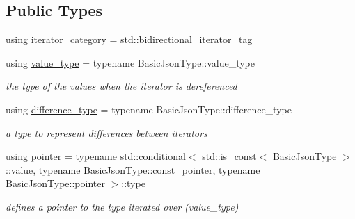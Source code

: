 \subsection*{Public Types}
\begin{DoxyCompactItemize}
\item 
using \mbox{\hyperlink{classnlohmann_1_1detail_1_1iter__impl_ad9e091f5c70b34b5b1abc1ab15fd9106}{iterator\+\_\+category}} = std\+::bidirectional\+\_\+iterator\+\_\+tag
\item 
\mbox{\label{classnlohmann_1_1detail_1_1iter__impl_ab35586a44f2222272c5346baa3013f67}} 
using \mbox{\hyperlink{classnlohmann_1_1detail_1_1iter__impl_ab35586a44f2222272c5346baa3013f67}{value\+\_\+type}} = typename Basic\+Json\+Type\+::value\+\_\+type
\begin{DoxyCompactList}\small\item\em the type of the values when the iterator is dereferenced \end{DoxyCompactList}\item 
\mbox{\label{classnlohmann_1_1detail_1_1iter__impl_a2f7ea9f7022850809c60fc3263775840}} 
using \mbox{\hyperlink{classnlohmann_1_1detail_1_1iter__impl_a2f7ea9f7022850809c60fc3263775840}{difference\+\_\+type}} = typename Basic\+Json\+Type\+::difference\+\_\+type
\begin{DoxyCompactList}\small\item\em a type to represent differences between iterators \end{DoxyCompactList}\item 
\mbox{\label{classnlohmann_1_1detail_1_1iter__impl_a69e52f890ce8c556fd68ce109e24b360}} 
using \mbox{\hyperlink{classnlohmann_1_1detail_1_1iter__impl_a69e52f890ce8c556fd68ce109e24b360}{pointer}} = typename std\+::conditional$<$ std\+::is\+\_\+const$<$ Basic\+Json\+Type $>$\+::\mbox{\hyperlink{classnlohmann_1_1detail_1_1iter__impl_ab447c50354c6611fa2ae0100ac17845c}{value}}, typename Basic\+Json\+Type\+::const\+\_\+pointer, typename Basic\+Json\+Type\+::pointer $>$\+::type
\begin{DoxyCompactList}\small\item\em defines a pointer to the type iterated over (value\+\_\+type) \end{DoxyCompactList}\item 

\end{DoxyCompactItemize}
